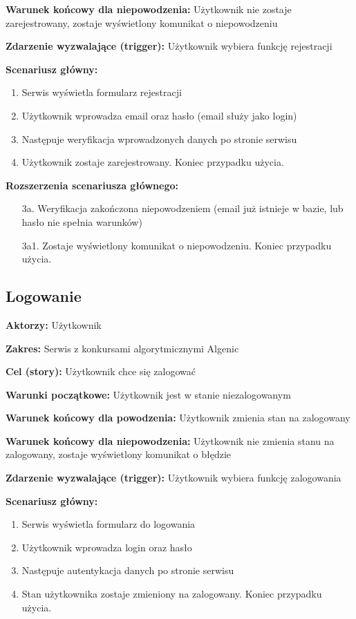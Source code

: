 \documentclass{article}
\begin{document}
\textbf{Warunek końcowy dla niepowodzenia:} Użytkownik nie zostaje zarejestrowany, zostaje wyświetlony komunikat o niepowodzeniu

\textbf{Zdarzenie wyzwalające (trigger):} Użytkownik wybiera funkcję rejestracji

\textbf{Scenariusz główny:}
\begin{enumerate}
	\item Serwis wyświetla formularz rejestracji
	\item Użytkownik wprowadza email oraz hasło (email służy jako login)
	\item Następuje weryfikacja wprowadzonych danych po stronie serwisu
	\item Użytkownik zostaje zarejestrowany. Koniec przypadku użycia.
\end{enumerate}

\textbf{Rozszerzenia scenariusza głównego:}
\begin{itemize}
	\item[3a.] Weryfikacja zakończona niepowodzeniem (email już istnieje w bazie, lub hasło nie spełnia warunków)
	\item[3a1.] Zostaje wyświetlony komunikat o niepowodzeniu. Koniec przypadku użycia.
\end{itemize}

\subsection{Logowanie}

\textbf{Aktorzy:} Użytkownik

\textbf{Zakres:} Serwis z konkursami algorytmicznymi Algenic

\textbf{Cel (story):} Użytkownik chce się zalogować

\textbf{Warunki początkowe:} Użytkownik jest w stanie niezalogowanym

\textbf{Warunek końcowy dla powodzenia:} Użytkownik zmienia stan na zalogowany

\textbf{Warunek końcowy dla niepowodzenia:} Użytkownik nie zmienia stanu na zalogowany, zostaje wyświetlony komunikat o błędzie

\textbf{Zdarzenie wyzwalające (trigger):} Użytkownik wybiera funkcję zalogowania

\textbf{Scenariusz główny:}
\begin{enumerate}
	\item Serwis wyświetla formularz do logowania
	\item Użytkownik wprowadza login oraz hasło
	\item Następuje autentykacja danych po stronie serwisu
	\item Stan użytkownika zostaje zmieniony na zalogowany. Koniec przypadku użycia.
\end{enumerate}
\end{document}
